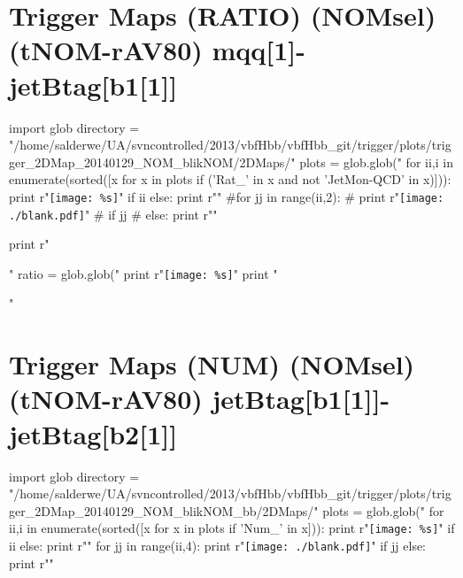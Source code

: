 \documentclass[12pt,english,dvipsnames]{beamer}
\newcommand{\UAoverlay}[0]{%
\begin{tikzpicture}[remember picture,overlay,shift={(current page.north east)}]
\node (zero) at (-1.8cm,-0.93cm) {\texttt{[image: ../logos/CMS.pdf]}\hspace{0.15cm}\texttt{[image: ../logos/CERN.pdf]}\hspace{0.15cm}\texttt{[image: ../logos/UA.pdf]}}; 
\end{tikzpicture}
}
\begin{document}
\section{Trigger Maps (RATIO) (NOMsel) (tNOM-rAV80) mqq[1]-jetBtag[b1[1]]}
\begin{frame}[t,fragile]%
\begin{python}
import glob
directory = "/home/salderwe/UA/svncontrolled/2013/vbfHbb/vbfHbb_git/trigger/plots/trigger_2DMap_20140129_NOM_blikNOM/2DMaps/"
plots = glob.glob("%
for ii,i in enumerate(sorted([x for x in plots if ('Rat_' in x and not 'JetMon-QCD' in x)])):
  print r"\texttt{[image: \%s]}"%
  if ii%
  else: print r"\hfill"
#for jj in range(ii,2):
#  print r"\texttt{[image: ./blank.pdf]}"
#  if jj%
#  else: print r"\hfill"
  
print r"\begin{minipage}{0.9999\textwidth}\centering"
ratio = glob.glob("%
print r"\texttt{[image: \%s]}"%
print "\end{minipage}"
\end{python} 
\end{frame}


\section{Trigger Maps (NUM) (NOMsel) (tNOM-rAV80) jetBtag[b1[1]]-jetBtag[b2[1]]}
\begin{frame}[t,fragile]%
\begin{python}
import glob
directory = "/home/salderwe/UA/svncontrolled/2013/vbfHbb/vbfHbb_git/trigger/plots/trigger_2DMap_20140129_NOM_blikNOM_bb/2DMaps/"
plots = glob.glob("%
for ii,i in enumerate(sorted([x for x in plots if 'Num_' in x])):
  print r"\texttt{[image: \%s]}"%
  if ii%
  else: print r"\hfill"
for jj in range(ii,4):
  print r"\texttt{[image: ./blank.pdf]}"
  if jj%
  else: print r"\hfill"
\end{python} 
\end{frame}
\end{document}

